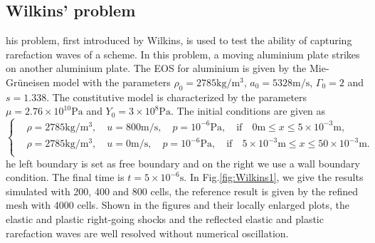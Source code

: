 \documentclass[review]{elsarticle}
\begin{document}
\subsection{Wilkins' problem}
his problem, first introduced by Wilkins, is used to test the  ability of capturing rarefaction waves of a scheme. In this problem, a moving aluminium plate strikes on another aluminium plate. The EOS for aluminium is given by the Mie-Gr\"uneisen model with the parameters $\rho_0 = 2785 \text{kg}/\text{m}^3$, $ a_0 = 5328 \text{m} /\text{s}$, $\Gamma_0 =2$ and $s = 1.338$. The constitutive model is characterized by the parameters $\mu = 2.76\times 10^{10} \text{Pa}$ and $Y_0 = 3\times 10^8 \text{Pa}$. The initial conditions are given as
\begin{equation}
 \left\{ \begin{aligned}
   &  \rho = 2785 \text{kg}/\text{m}^3, \quad  u = 800\text{m}/\text{s}, \quad  p = 10^{-6}\text{Pa}, \quad  \text{if} \quad  0\text{m} \le x \le 5\times 10^{-3} \text{m},\\
   &  \rho = 2785 \text{kg}/\text{m}^3, \quad  u = 0\text{m}/\text{s}, \quad  p = 10^{-6}\text{Pa}, \quad  \text{if}  \quad  5 \times 10^{-3}\text{m} \le x \le 50\times 10^{-3} \text{m}.\\
   \end{aligned}
 \right.
\end{equation}
he left boundary is set as free boundary and on  the right we use a wall boundary condition. The final time is $t =5\times 10^{-6} \text{s}$. In Fig.\ref{fig:Wilkins1}, we give the results  simulated with 200, 400 and 800 cells, the reference result is given by the refined mesh with 4000 cells. Shown in the figures and their locally enlarged plots, the elastic and plastic right-going shocks and the reflected elastic and plastic rarefaction waves are well resolved without numerical oscillation.

\end{document}
